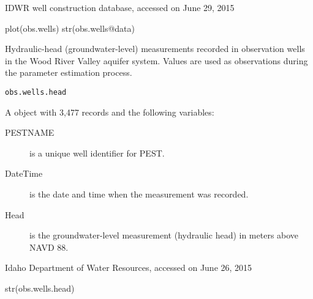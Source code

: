 \documentclass[a4paper]{book}
\begin{document}
%
\begin{Source}\relax
IDWR well construction database, accessed on June 29, 2015
\end{Source}
%
\begin{SeeAlso}\relax
{}
\end{SeeAlso}
%
\begin{Examples}
\begin{ExampleCode}
plot(obs.wells)
str(obs.wells@data)
\end{ExampleCode}
\end{Examples}
%
\begin{Description}\relax
Hydraulic-head (groundwater-level) measurements recorded in observation wells in the Wood River Valley aquifer system.
Values are used as observations during the parameter estimation process.
\end{Description}
%
\begin{Usage}
\begin{verbatim}
obs.wells.head
\end{verbatim}
\end{Usage}
%
\begin{Format}
A  object with 3,477 records and the following variables:
\begin{description}

\item[PESTNAME] is a unique well identifier for PEST.
\item[DateTime] is the date and time when the measurement was recorded.
\item[Head] is the groundwater-level measurement (hydraulic head) in meters above NAVD 88.

\end{description}

\end{Format}
%
\begin{Source}\relax
Idaho Department of Water Resources, accessed on June 26, 2015
\end{Source}
%
\begin{SeeAlso}\relax
{}
\end{SeeAlso}
%
\begin{Examples}
\begin{ExampleCode}
str(obs.wells.head)
\end{ExampleCode}
\end{Examples}
\end{document}
